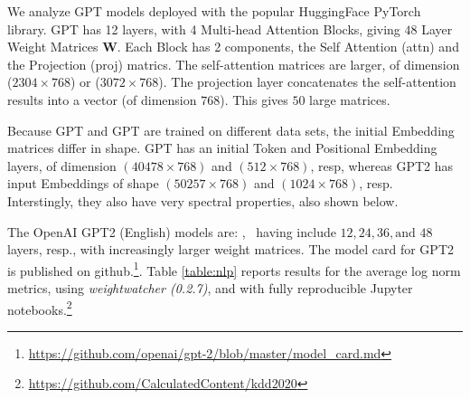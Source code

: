 We analyze GPT models deployed with the popular HuggingFace PyTorch library.
GPT has 12 layers, with 4 Multi-head Attention Blocks, giving $48$ Layer Weight Matrices $\mathbf{W}$.
Each Block has 2 components, the Self Attention (attn) and the Projection (proj) matrics.  
The self-attention  matrices are larger, of dimension ($2304\times 768$) or ($3072\times 768$).
The projection layer concatenates the self-attention results into a vector (of dimension $768$).
This gives $50$ large matrices.

Because GPT and GPT are trained on different data sets, the initial Embedding matrices differ in shape.
GPT  has an initial Token and Positional Embedding layers, of dimension
$(40478\times 768)$ and $(512\times 768)$, resp, whereas GPT2 has input Embeddings of shape
$(50257\times 768)$ and $(1024\times 768)$, resp.  Interstingly, they also have very spectral properties,
also shown below.

The OpenAI GPT2 (English) models are: , \
having include $12, 24, 36, \text{and }48$ layers, resp., with increasingly larger weight matrices.
The model card for GPT2 is published on github.\footnote{\url{https://github.com/openai/gpt-2/blob/master/model_card.md}}.
Table \ref{table:nlp} reports results for the average log norm metrics, using \emph{weightwatcher (0.2.7)},
and with fully reproducible Jupyter notebooks.\footnote{\url{https://github.com/CalculatedContent/kdd2020}}


